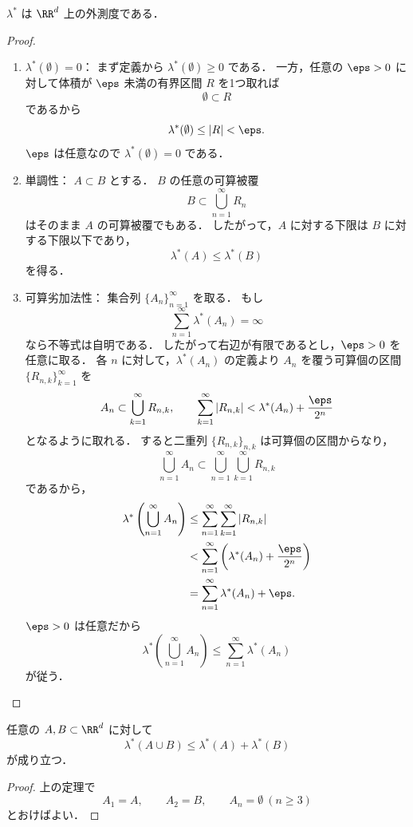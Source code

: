 \begin{theorem}[Lebesgue外測度は外測度]
$\lambda^*$ は $\RR^d$ 上の外測度である．
\end{theorem}
\begin{proof}
\begin{enumerate}
    \item $\lambda^*(\emptyset)=0$：
    まず定義から $\lambda^*(\emptyset)\ge 0$ である．
    一方，任意の $\eps > 0$ に対して体積が $\eps$ 未満の有界区間 $R$ を1つ取れば
    \[
    \emptyset \subset R
    \]
    であるから
    \[
    \lambda^*(\emptyset) \le |R| < \eps.
    \]
    $\eps$ は任意なので $\lambda^*(\emptyset)=0$ である．

    \item 単調性：
    $A \subset B$ とする．
    $B$ の任意の可算被覆
    \[
    B \subset \bigcup_{n=1}^{\infty} R_n
    \]
    はそのまま $A$ の可算被覆でもある．
    したがって，$A$ に対する下限は $B$ に対する下限以下であり，
    \[
    \lambda^*(A) \le \lambda^*(B)
    \]
    を得る．

    \item 可算劣加法性：
    集合列 $\{A_n\}_{n=1}^{\infty}$ を取る．
    もし
    \[
    \sum_{n=1}^{\infty}\lambda^*(A_n)=\infty
    \]
    なら不等式は自明である．
    したがって右辺が有限であるとし，$\eps > 0$ を任意に取る．
    各 $n$ に対して，$\lambda^*(A_n)$ の定義より
    $A_n$ を覆う可算個の区間 $\{R_{n,k}\}_{k=1}^{\infty}$ を
    \[
    A_n \subset \bigcup_{k=1}^{\infty} R_{n,k},
    \qquad
    \sum_{k=1}^{\infty} |R_{n,k}|
    <
    \lambda^*(A_n) + \frac{\eps}{2^n}
    \]
    となるように取れる．
    すると二重列 $\{R_{n,k}\}_{n,k}$ は可算個の区間からなり，
    \[
    \bigcup_{n=1}^{\infty} A_n
    \subset
    \bigcup_{n=1}^{\infty}\bigcup_{k=1}^{\infty} R_{n,k}
    \]
    であるから，
    \begin{align*}
    \lambda^*\left(\bigcup_{n=1}^{\infty} A_n\right)
    &\le
    \sum_{n=1}^{\infty}\sum_{k=1}^{\infty} |R_{n,k}| \\
    &<
    \sum_{n=1}^{\infty}
    \left(
    \lambda^*(A_n)+\frac{\eps}{2^n}
    \right) \\
    &=
    \sum_{n=1}^{\infty}\lambda^*(A_n)+\eps.
    \end{align*}
    $\eps > 0$ は任意だから
    \[
    \lambda^*\left(\bigcup_{n=1}^{\infty} A_n\right)
    \le
    \sum_{n=1}^{\infty}\lambda^*(A_n)
    \]
    が従う．
\end{enumerate}
\end{proof}

\begin{corollary}[有限劣加法性]
任意の $A,B \subset \RR^d$ に対して
\[
\lambda^*(A \cup B) \le \lambda^*(A) + \lambda^*(B)
\]
が成り立つ．
\end{corollary}
\begin{proof}
上の定理で
\[
A_1=A,\qquad A_2=B,\qquad A_n=\emptyset\ (n \ge 3)
\]
とおけばよい．
\end{proof}

